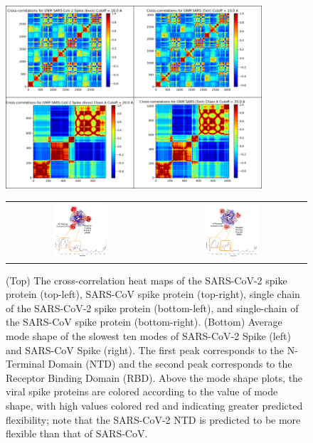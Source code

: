 \begin{figure}[p]
	\centering
	\mySfFamily
	\includegraphics[width = 0.85\textwidth]{../images/CrossCorr.png}\\[2ex]
	\begin{tabular}{c c}
	\includegraphics[width = 0.38\textwidth]{../images/spike_slowmode_SARS-CoV-2.png} & \includegraphics[width = 0.38\textwidth]{../images/spike_slowmode_SARS-CoV.png}
	\end{tabular}
	\caption{(Top) The cross-correlation heat maps of the SARS-CoV-2 spike protein (top-left), SARS-CoV spike protein (top-right), single chain of the SARS-CoV-2 spike protein (bottom-left), and single-chain of the SARS-CoV spike protein (bottom-right). (Bottom) Average mode shape of the slowest ten modes of SARS-CoV-2 Spike (left) and SARS-CoV Spike (right). The first peak corresponds to the N-Terminal Domain (NTD) and the second peak corresponds to the Receptor Binding Domain (RBD). Above the mode shape plots, the viral spike proteins are colored according to the value of mode shape, with high values colored red and indicating greater predicted flexibility; note that the SARS-CoV-2 NTD is predicted to be more flexible than that of SARS-CoV.}
	\label{fig:spike_crosscorr_slowmode}
\end{figure}


